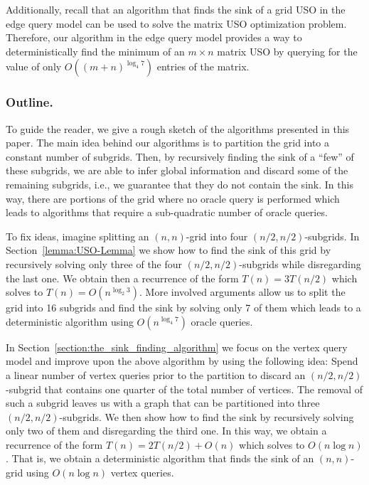 \documentclass[runningheads,a4paper]{llncs}
\begin{document}
Additionally, recall that an algorithm that finds the sink of a grid USO in the edge query model can be used to solve the matrix USO optimization problem. 
Therefore, our algorithm in the edge query model provides a way to deterministically find the minimum of an $m\times n$ matrix USO by querying for the value of only $O((m+n)^{\log_4 7})$ entries of the matrix. 

\subsubsection{Outline.}

To guide the reader, we give a rough sketch of the algorithms presented in this paper.
The main idea behind our algorithms is to partition the grid into a constant number of subgrids. 
Then, by recursively finding the sink of a ``few'' of these subgrids, we are able to infer global information and discard some of the remaining subgrids, i.e., we guarantee that they do not contain the sink. 
In this way, there are portions of the grid where no oracle query is performed which leads to algorithms that require a sub-quadratic number of oracle queries.

To fix ideas, imagine splitting an $(n,n)$-grid into four $(n/2, n/2)$-subgrids. 
In Section~\ref{lemma:USO-Lemma} we show how to find the sink of this grid by recursively solving only three of the four $(n/2, n/2)$-subgrids while disregarding the last one. 
We obtain then a recurrence of the form $T(n) = 3 T(n/2)$ which solves to $T(n) = O(n^{\log_2 3})$.
More involved arguments allow us to split the grid into 16 subgrids and find the sink by solving only 7 of them which leads to a deterministic algorithm using $O(n^{\log_4 7})$ oracle queries.

In Section~\ref{section:the_sink_finding_algorithm} we focus on the vertex query model and improve upon the above algorithm by using the following idea: Spend a linear number of vertex queries prior to the partition to discard an $(n/2, n/2)$-subgrid that contains one quarter of the total number of vertices. 
The removal of such a subgrid leaves us with a graph that can be partitioned into three $(n/2, n/2)$-subgrids. 
We then show how to find the sink by recursively solving only two of them and disregarding the third one. In this way, we obtain a recurrence of the form $T(n) = 2 T(n/2) + O(n)$ which solves to $O(n \log n)$. 
That is, we obtain a deterministic algorithm that finds the sink of an $(n, n)$-grid using $O(n \log n)$ vertex queries. 
\end{document}
